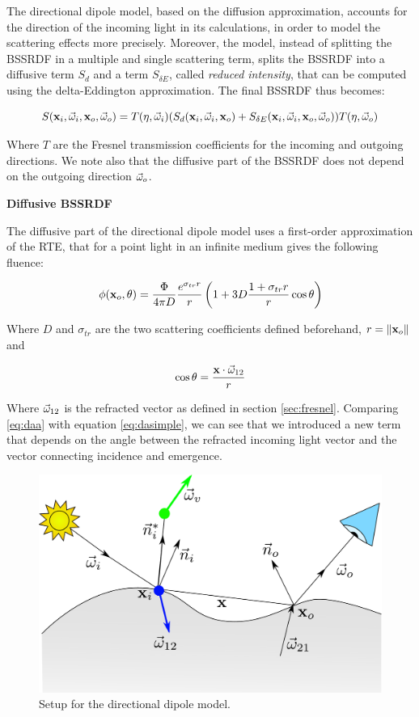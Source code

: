The directional dipole model, based on the diffusion approximation, accounts for the direction of the incoming light in its calculations, in order to model the scattering effects more precisely. Moreover, the model, instead of splitting the BSSRDF in a multiple and single scattering term, splits the BSSRDF into a diffusive term $S_d$ and a term $S_{\delta E}$, called \emph{reduced intensity}, that can be computed using the delta-Eddington approximation\cite{delta}. The final BSSRDF thus becomes:

$$
S(\mathbf{x}_i, \vec{\omega}_i, \mathbf{x}_o, \vec{\omega}_o) = T(\eta,\vec{\omega}_i) (S_d(\mathbf{x}_i, \vec{\omega}_i, \mathbf{x}_o) + S_{\delta E}(\mathbf{x}_i, \vec{\omega}_i, \mathbf{x}_o, \vec{\omega}_o)) T(\eta,\vec{\omega}_o)
\label{eq:bssrdfgen}
$$

Where $T$ are the Fresnel transmission coefficients for the incoming and outgoing directions. We note also that the diffusive part of the BSSRDF does not depend on the outgoing direction $\vec{\omega}_o$. 

\textbf{Diffusive BSSRDF}

The diffusive part of the directional dipole model uses a first-order approximation of the RTE, that for a point light in an infinite medium gives the following fluence:

$$
\phi(\mathbf{x}_o, \theta) = \frac{\Phi}{4\pi D} \frac{e^{\sigma_{tr} r}}{r} \left( 1 + 3D\frac{1 + \sigma_{tr} r}{r}\cos\theta\right)
\label{eq:daa}
$$

Where $D$ and $\sigma_{tr}$ are the two scattering coefficients defined beforehand, $r = \|\mathbf{x}_o\|$ and 

$$
\cos \theta = \frac{\mathbf{x} \cdot \vec{\omega}_{12}}{r}
$$

Where $\vec{\omega}_{12}$ is the refracted vector as defined in section \ref{sec:fresnel}. Comparing \ref{eq:daa} with equation \ref{eq:dasimple}, we can see that we introduced a new term that depends on the angle between the refracted incoming light vector and the vector connecting incidence and emergence. 

\begin{figure}[!ht]
\centering
\includegraphics[width=\textwidth]{images/jeppe.pdf}
\caption{Setup for the directional dipole model.}
\label{fig:jeppe}
\end{figure}

